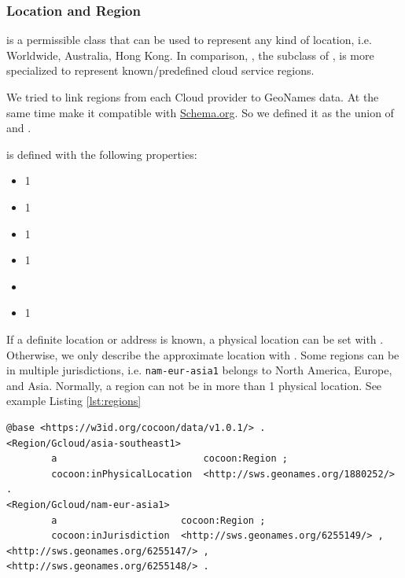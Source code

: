 \subsubsection{Location and Region}
\label{sec:Region}
 is a permissible class that can be used to represent any kind of location, i.e. Worldwide, Australia, Hong Kong.
In comparison, , the subclass of , is more specialized to represent known/predefined cloud service regions.

We tried to link regions from each Cloud provider to GeoNames \cite{GeoNames} data. At the same time make it compatible with \url{Schema.org}.
So we defined it as the union of  and .

 is defined with the following properties:
\begin{itemize}
  \item[]   1 
  \item[]   1 
  \item[]   1 
  \item[]   1 
  \item[]   
  \item[]   1 
\end{itemize}

If a definite location or address is known, a
physical location can be set with .
Otherwise, we only describe the approximate location with
.
Some regions can be in multiple jurisdictions, i.e. \texttt{nam-eur-asia1}
belongs to North America, Europe, and Asia.
Normally, a region can not be in more than 1 physical location.
See example Listing \ref{lst:regions}
\begin{lstlisting}[caption={Regions},label={lst:regions}]
@base <https://w3id.org/cocoon/data/v1.0.1/> .
<Region/Gcloud/asia-southeast1>
        a                          cocoon:Region ;
        cocoon:inPhysicalLocation  <http://sws.geonames.org/1880252/> .
<Region/Gcloud/nam-eur-asia1>
        a                      cocoon:Region ;
        cocoon:inJurisdiction  <http://sws.geonames.org/6255149/> , <http://sws.geonames.org/6255147/> , <http://sws.geonames.org/6255148/> .
\end{lstlisting}

